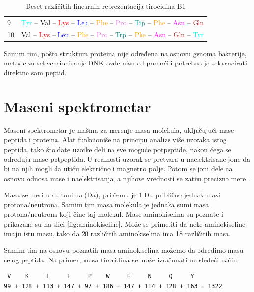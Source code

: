\documentclass[12pt,oneside]{memoir}
\begin{document}
\begin{table}[H]
\begin{tabular}{ll}
9 & \textcolor{cyan}{Tyr} – \textcolor{green!70!black}{Val} – \textcolor{red}{Lys} – \textcolor{blue}{Leu} – \textcolor{orange}{Phe} – \textcolor{violet}{Pro} – \textcolor{teal}{Trp} – \textcolor{orange}{Phe} – \textcolor{magenta}{Asn} – \textcolor{brown}{Gln} \\
10 & \textcolor{green!70!black}{Val} – \textcolor{red}{Lys} – \textcolor{blue}{Leu} – \textcolor{orange}{Phe} – \textcolor{violet}{Pro} – \textcolor{teal}{Trp} – \textcolor{orange}{Phe} – \textcolor{magenta}{Asn} – \textcolor{brown}{Gln} – \textcolor{cyan}{Tyr} \\
\bottomrule
\end{tabular}
\caption{Deset različitih linearnih reprezentacija tirocidina B1}
\label{tab:linear_representations}
\end{table}

Samim tim, pošto struktura proteina nije određena na osnovu genoma bakterije, metode za sekvencioniranje DNK ovde nisu od pomoći i potrebno je sekvencirati direktno sam peptid.

\section{Maseni spektrometar}
Maseni spektrometar je mašina za merenje masa molekula, uključujući mase peptida i proteina. Alat funkcioniše na principu analize više uzoraka istog peptida, tako što date uzorke deli na sve moguće potpeptide, nakon čega se određuju mase potpeptida. U realnosti uzorak se pretvara u naelektrisane jone da bi na njih mogli da utiču električno i magnetno polje. Potom se joni dele na osnovu odnosa mase i naelektrisanja, a njihove vrednosti se zatim precizno mere \cite{spectrometer}.

Masa se meri u daltonima (Da), pri čemu je 1 Da približno jednak masi protona/neutrona. Samim tim masa molekula je jednaka sumi masa protona/neutrona koji čine taj molekul. Mase aminokiselina su poznate i prikazane su na slici \ref{fig:aminokiseline}. Može se primetiti da neke aminokiseline imaju istu masu, tako da 20 različitih aminokiselina ima 18 različitih masa.

Samim tim na osnovu poznatih masa aminokiselina možemo da odredimo masu celog peptida. Na primer, masa tirocidina se može izračunati na sledeći način:
\begin{verbatim}
 V    K     L     F     P    W     F     N     Q     Y     
99 + 128 + 113 + 147 + 97 + 186 + 147 + 114 + 128 + 163 = 1322
\end{verbatim}
\end{document}
